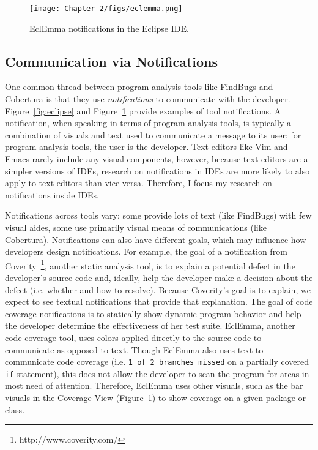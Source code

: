 \begin{figure} [ht]
	\centering
	\texttt{[image: Chapter-2/figs/eclemma.png]}
	\caption{EclEmma notifications in the Eclipse IDE.}
	\label{fig:ecl}
\end{figure}


\subsection{Communication via Notifications}\label{subsec:comm}

One common thread between program analysis tools like FindBugs and Cobertura is that they use \emph{notifications} to communicate with the developer. Figure~\ref{fig:eclipse} and Figure~\ref{fig:ecl} provide examples of tool notifications. 
A notification, when speaking in terms of program analysis tools, is typically a combination of visuals and text used to communicate a message to its user; for program analysis tools, the user is the developer.
Text editors like Vim and Emacs rarely include any visual components, however, because text editors are a simpler versions of IDEs, research on notifications in IDEs are more likely to also apply to text editors than vice versa. 
Therefore, I focus my research on notifications inside IDEs.

Notifications across tools vary; some provide lots of text (like FindBugs) with few visual aides, some use primarily visual means of communications (like Cobertura). Notifications can also have different goals, which may influence how developers design notifications. For example, the goal of a notification from Coverity~\footnote{http://www.coverity.com/}, another static analysis tool, is to explain a potential defect in the developer's source code and, ideally, help the developer make a decision about the defect (i.e. whether and how to resolve). Because Coverity's goal is to explain, we expect to see textual notifications that provide that explanation.
The goal of code coverage notifications is to statically show dynamic program behavior and help the developer determine the effectiveness of her test suite. EclEmma, another code coverage tool, uses colors applied directly to the source code to communicate as opposed to text. Though EclEmma also uses text to communicate code coverage (i.e. \texttt{1 of 2 branches missed} on a partially covered \texttt{if} statement), this does not allow the developer to scan the program for areas in most need of attention. Therefore, EclEmma uses other visuals, such as the bar visuals in the Coverage View (Figure~\ref{fig:ecl}) to show coverage on a given package or class.

